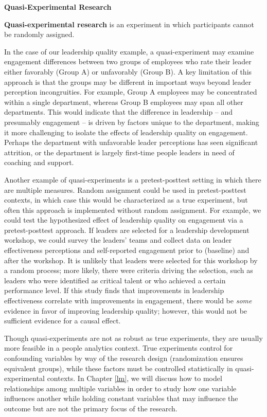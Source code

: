 \documentclass[]{book}
\begin{document}
\textbf{Quasi-Experimental Research}

\textbf{Quasi-experimental research} is an experiment in which participants cannot be randomly assigned.

In the case of our leadership quality example, a quasi-experiment may examine engagement differences between two groups of employees who rate their leader either favorably (Group A) or unfavorably (Group B). A key limitation of this approach is that the groups may be different in important ways beyond leader perception incongruities. For example, Group A employees may be concentrated within a single department, whereas Group B employees may span all other departments. This would indicate that the difference in leadership -- and presumably engagement -- is driven by factors unique to the department, making it more challenging to isolate the effects of leadership quality on engagement. Perhaps the department with unfavorable leader perceptions has seen significant attrition, or the department is largely first-time people leaders in need of coaching and support.

Another example of quasi-experiments is a pretest-posttest setting in which there are multiple measures. Random assignment could be used in pretest-posttest contexts, in which case this would be characterized as a true experiment, but often this approach is implemented without random assignment. For example, we could test the hypothesized effect of leadership quality on engagement via a pretest-posttest approach. If leaders are selected for a leadership development workshop, we could survey the leaders' teams and collect data on leader effectiveness perceptions and self-reported engagement prior to (baseline) and after the workshop. It is unlikely that leaders were selected for this workshop by a random process; more likely, there were criteria driving the selection, such as leaders who were identified as critical talent or who achieved a certain performance level. If this study finds that improvements in leadership effectiveness correlate with improvements in engagement, there would be \emph{some} evidence in favor of improving leadership quality; however, this would not be sufficient evidence for a causal effect.

Though quasi-experiments are not as robust as true experiments, they are usually more feasible in a people analytics context. True experiments control for confounding variables by way of the research design (randomization ensures equivalent groups), while these factors must be controlled statistically in quasi-experimental contexts. In Chapter \ref{lm}, we will discuss how to model relationships among multiple variables in order to study how one variable influences another while holding constant variables that may influence the outcome but are not the primary focus of the research.
\end{document}
